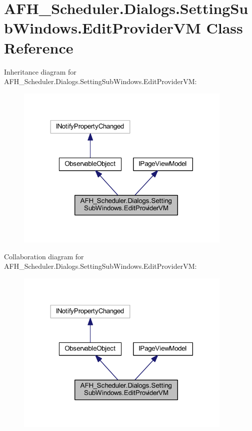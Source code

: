 \section{A\+F\+H\+\_\+\+Scheduler.\+Dialogs.\+Setting\+Sub\+Windows.\+Edit\+Provider\+VM Class Reference}
\label{class_a_f_h___scheduler_1_1_dialogs_1_1_setting_sub_windows_1_1_edit_provider_v_m}


Inheritance diagram for A\+F\+H\+\_\+\+Scheduler.\+Dialogs.\+Setting\+Sub\+Windows.\+Edit\+Provider\+VM\+:
\nopagebreak
\begin{figure}[H]
\begin{center}
\leavevmode
\includegraphics[width=293pt]{class_a_f_h___scheduler_1_1_dialogs_1_1_setting_sub_windows_1_1_edit_provider_v_m__inherit__graph}
\end{center}
\end{figure}


Collaboration diagram for A\+F\+H\+\_\+\+Scheduler.\+Dialogs.\+Setting\+Sub\+Windows.\+Edit\+Provider\+VM\+:
\nopagebreak
\begin{figure}[H]
\begin{center}
\leavevmode
\includegraphics[width=293pt]{class_a_f_h___scheduler_1_1_dialogs_1_1_setting_sub_windows_1_1_edit_provider_v_m__coll__graph}
\end{center}
\end{figure}

